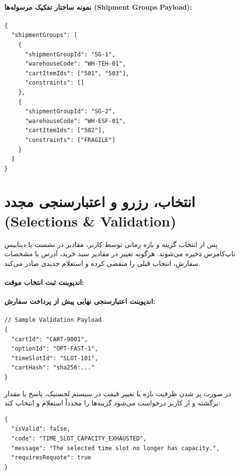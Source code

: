 \documentclass[11pt,a4paper]{article}
\begin{document}
\paragraph{نمونه ساختار تفکیک مرسوله‌ها (Shipment Groups Payload):}
\begin{latin}
\begin{verbatim}
{
  "shipmentGroups": [
    {
      "shipmentGroupId": "SG-1",
      "warehouseCode": "WH-TEH-01",
      "cartItemIds": ["501", "503"],
      "constraints": []
    },
    {
      "shipmentGroupId": "SG-2",
      "warehouseCode": "WH-ESF-01",
      "cartItemIds": ["502"],
      "constraints": ["FRAGILE"]
    }
  ]
}
\end{verbatim}
\end{latin}

\section{انتخاب، رزرو و اعتبارسنجی مجدد (Selections \& Validation)}
پس از انتخاب گزینه و بازه زمانی توسط کاربر، مقادیر در نشست یا دیتابیس ناپ‌کامرس ذخیره می‌شوند. هرگونه تغییر در مقادیر سبد خرید، آدرس یا مشخصات سفارش، انتخاب قبلی را منقضی کرده و استعلام جدیدی صادر می‌کند.

\paragraph{اندپوینت ثبت انتخاب موقت:} 

\paragraph{اندپوینت اعتبارسنجی نهایی پیش از پرداخت سفارش:} 

\begin{latin}
\begin{verbatim}
// Sample Validation Payload
{
  "cartId": "CART-9001",
  "optionId": "OPT-FAST-1",
  "timeSlotId": "SLOT-101",
  "cartHash": "sha256:..."
}
\end{verbatim}
\end{latin}
در صورت پر شدن ظرفیت بازه یا تغییر قیمت در سیستم لجستیک، پاسخ با مقدار  برگشته و از کاربر درخواست می‌شود گزینه‌ها را مجدداً استعلام و انتخاب کند:

\begin{latin}
\begin{verbatim}
{
  "isValid": false,
  "code": "TIME_SLOT_CAPACITY_EXHAUSTED",
  "message": "The selected time slot no longer has capacity.",
  "requiresRequote": true
}
\end{verbatim}
\end{latin}
\end{document}

